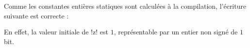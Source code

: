 Comme les constantes entières statiques sont calculées à la compilation, l'écriture suivante est correcte :

En effet, la valeur initiale de \plm!z! est $1$, représentable par un entier non signé de $1$ bit.


